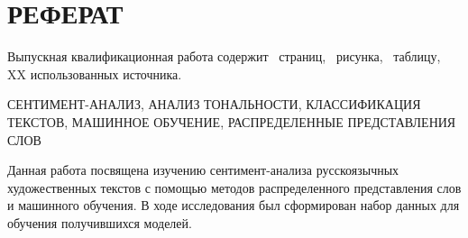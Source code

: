 \chapter*{РЕФЕРАТ}









%
%

\bigskip\par
Выпускная квалификационная работа содержит \pageref*{LastPage}~страниц, \totfig~рисунка,                                        \tottab~таблицу, XX использованных источника.

\bigskip\par
СЕНТИМЕНТ-АНАЛИЗ, АНАЛИЗ ТОНАЛЬНОСТИ, КЛАССИФИКАЦИЯ ТЕКСТОВ, МАШИННОЕ ОБУЧЕНИЕ, РАСПРЕДЕЛЕННЫЕ ПРЕДСТАВЛЕНИЯ СЛОВ

\bigskip\par
Данная работа посвящена изучению сентимент-анализа русскоязычных художественных текстов с помощью методов распределенного представления слов и машинного обучения. В ходе исследования был сформирован набор данных для обучения получившихся моделей.

